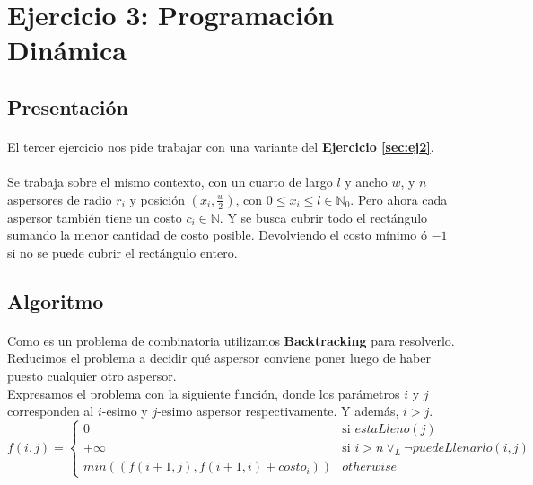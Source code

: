 \documentclass[./main.tex]{subfiles}
\begin{document}
\section{Ejercicio 3: Programación Dinámica}
\label{sec:ej3}

\subsection{Presentación}
\label{sec:ej3-intro}

\paragraph{} El tercer ejercicio nos pide trabajar con una variante del \textbf{Ejercicio \ref{sec:ej2}}.

\paragraph{} Se trabaja sobre el mismo contexto, con un cuarto de largo \(l\) y ancho \(w\), y \(n\) aspersores de radio \(r_i\) y posición \((x_i, \frac{w}{2})\), con \(0 \leq x_i \leq l \in \mathbb{N}_0\). Pero ahora cada aspersor también tiene un costo \(c_i \in \mathbb{N}\). Y se busca cubrir todo el rectángulo sumando la menor cantidad de costo posible. Devolviendo el costo mínimo ó \(-1\) si no se puede cubrir el rectángulo entero.

\subsection{Algoritmo}
\label{sec:ej3-algo}

\paragraph{} Como es un problema de combinatoria utilizamos \textbf{Backtracking} para resolverlo. \\
Reducimos el problema a decidir qué aspersor conviene poner luego de haber puesto cualquier otro aspersor. \\
Expresamos el problema con la siguiente función, donde los parámetros \(i\) y \(j\) corresponden al \(i\)-esimo y \(j\)-esimo aspersor respectivamente. Y además, \(i > j\).
\begin{equation}
  f(i, j) = \begin{cases}
     0  & \text{si } estaLleno(j) \\
     +\infty & \text{si } i > n \lor_L \neg puedeLlenarlo(i, j) \\
     min((f(i+1, j), f(i+1, i) + costo_i)) & otherwise
   \end{cases}
\end{equation}
\end{document}

